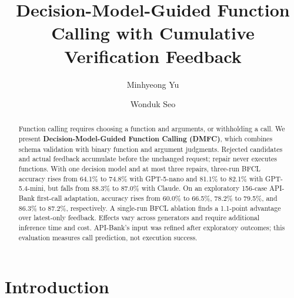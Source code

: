 \documentclass[sigconf,nonacm]{acmart}
\begin{document}
\title{Decision-Model-Guided Function Calling with Cumulative Verification Feedback}

\author{Minhyeong Yu}


\author{Wonduk Seo}
\correspondingauthor
{}



\renewcommand{\shortauthors}{Yu and Seo}

\begin{abstract}
Function calling requires choosing a function and arguments, or withholding a call. We present \textbf{Decision-Model-Guided Function Calling (DMFC)}, which combines schema validation with binary function and argument judgments. Rejected candidates and actual feedback accumulate before the unchanged request; repair never executes functions. With one decision model and at most three repairs, three-run BFCL accuracy rises from 64.1\% to 74.8\% with GPT-5-nano and 81.1\% to 82.1\% with GPT-5.4-mini, but falls from 88.3\% to 87.0\% with Claude. On an exploratory 156-case API-Bank first-call adaptation, accuracy rises from 60.0\% to 66.5\%, 78.2\% to 79.5\%, and 86.3\% to 87.2\%, respectively. A single-run BFCL ablation finds a 1.1-point advantage over latest-only feedback. Effects vary across generators and require additional inference time and cost. API-Bank's input was refined after exploratory outcomes; this evaluation measures call prediction, not execution success.
\end{abstract}





\maketitle
\raggedbottom



\section{Introduction}

\end{document}
